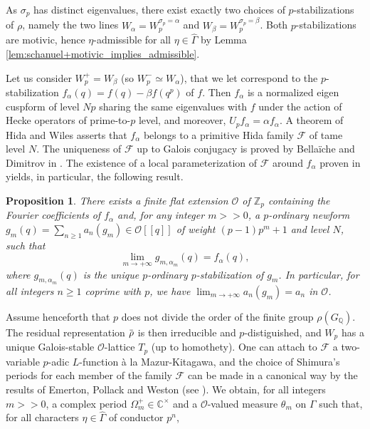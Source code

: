 \documentclass[12pt]{amsart}
\newcommand\bC{\mathbb{C}}
\newcommand\bQ{\mathbb{Q}}
\newcommand\Zp{{\mathbb{Z}_p}}
\newcommand\cF{\mathcal{F}}
\newcommand\cO{\mathcal{O}}
\newcommand{\ob}[1]{\mkern 1.5mu\overline{\mkern-1.5mu#1\mkern-1.5mu}\mkern 1.5mu}
\theoremstyle{defstyle}
\theoremstyle{thmstyle}
\newtheorem{proposition}[subsubsection]{Proposition}
\begin{document}
As $\sigma_p$ has distinct eigenvalues, there exist exactly two choices of $p$-stabilizations of $\rho$, namely the two lines $W_\alpha=W_p^{\sigma_p=\alpha}$ and $W_\beta=W_p^{\sigma_p=\beta}$. Both $p$-stabilizations are motivic, hence $\eta$-admissible for all $\eta\in\widehat{\Gamma}$ by Lemma \ref{lem:schanuel+motivic_implies_admissible}. 


Let us consider $W_p^+=W_\beta$ (so $W_p^-\simeq W_\alpha$), that we let correspond to the $p$-stabilization $f_\alpha(q)=f(q)-\beta f(q^p)$ of $f$. Then $f_\alpha$ is a normalized eigen cuspform of level $Np$ sharing the same eigenvalues with $f$ under the action of Hecke operators of prime-to-$p$ level, and moreover, $U_p f_\alpha = \alpha f_\alpha$. A theorem of Hida and Wiles asserts that $f_\alpha$ belongs to a primitive Hida family $\cF$ of tame level $N$. The uniqueness of $\cF$ up to Galois conjugacy is proved by Bellaïche and Dimitrov in \cite{bellaiche2016eigencurve}. The existence of a local parameterization of $\cF$ around $f_\alpha$ proven in \cite[Cor. 4.7.3]{maks} yields, in particular, the following result. 

\begin{proposition}
There exists a finite flat extension $\cO$ of $\Zp$ containing the Fourier coefficients of $f_\alpha$ and, for any integer $m>>0$, a $p$-ordinary newform $g_m(q)=\sum_{n\geq 1}a_n(g_m)\in\cO[[q]]$ of weight $(p-1)p^m+1$ and level $N$, such that 
\[\lim_{m\to +\infty} g_{m,\alpha_m}(q) = f_\alpha(q),\]
where $g_{m,\alpha_m}(q)$ is the unique $p$-ordinary $p$-stabilization of $g_m$. In particular, for all integers $n\geq 1$ coprime with $p$, we have  $\lim_{m\to +\infty} a_n(g_m) = a_n$ in $\cO$.

\end{proposition}

Assume henceforth that $p$ does not divide the order of the finite group $\rho(G_\bQ)$. The residual representation $\ob{\rho}$ is then irreducible and $p$-distiguished, and $W_p$ has a unique Galois-stable $\cO$-lattice $T_p$ (up to homothety). One can attach to $\cF$ a two-variable $p$-adic $L$-function à la Mazur-Kitagawa, and the choice of Shimura's periods for each member of the family $\cF$ can be made in a canonical way by the results of Emerton, Pollack and Weston (see \cite[\S3.3-4]{emerton2006variation}). We obtain, for all integers $m>>0$, a complex period $\Omega_m^+\in\bC^\times$ and a $\cO$-valued measure $\theta_m$ on $\Gamma$ such that, for all characters $\eta \in\widehat{\Gamma}$ of conductor $p^n$,
\end{document}
